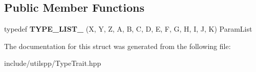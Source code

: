 \subsection*{Public Member Functions}
\begin{DoxyCompactItemize}
\item 
\hypertarget{structutilspp_1_1PointerOnMemberFunction_3_01W_07V_1_1_5_08_07X_00_01Y_00_01Z_00_01A_00_01B_00_0b928f54f704c64390834c6654b40f718_abeb258e67c4db620878c3c3610131408}{typedef {\bfseries T\-Y\-P\-E\-\_\-\-L\-I\-S\-T\-\_} (X, Y, Z, A, B, C, D, E, F, G, H, I, J, K) Param\-List}\label{structutilspp_1_1PointerOnMemberFunction_3_01W_07V_1_1_5_08_07X_00_01Y_00_01Z_00_01A_00_01B_00_0b928f54f704c64390834c6654b40f718_abeb258e67c4db620878c3c3610131408}

\end{DoxyCompactItemize}


The documentation for this struct was generated from the following file\-:\begin{DoxyCompactItemize}
\item 
include/utilspp/Type\-Trait.\-hpp\end{DoxyCompactItemize}
